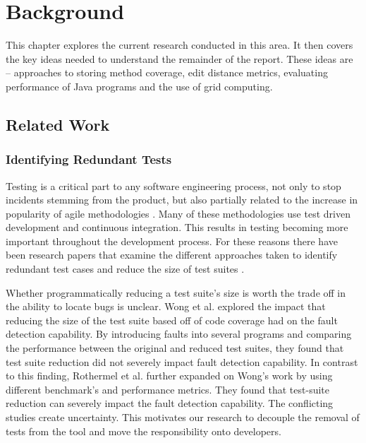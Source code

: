 \chapter{Background}\label{C:related}

This chapter explores the current research conducted in this area. It then covers the key ideas needed to understand the remainder of the report. These ideas are -- approaches to storing method coverage, edit distance metrics, evaluating performance of Java programs and the use of grid computing.

\section{Related Work}
\label{relatedworkRef}
\subsection{Identifying Redundant Tests}
Testing is a critical part to any software engineering process, not only to stop incidents stemming from the product, but also partially related to the increase in popularity of agile methodologies \cite{chaos}. Many of these methodologies use test driven development and continuous integration. This results in testing becoming more important throughout the development process. For these reasons there have been research papers that examine the different approaches taken to identify redundant test cases and reduce the size of test suites \cite{wong1995effect, wong1999test, rothermel1998empirical, rothermel2002empirical,koochakzadeh2009test,zhang2011empirical,li2008static}.

Whether programmatically reducing a test suite's size is worth the trade off in the ability to locate bugs is unclear.  Wong et al. \cite{wong1995effect, wong1999test} explored the impact that reducing the size of the test suite based off of code coverage had on the fault detection capability. By introducing faults into several programs and comparing the performance between the original and reduced test suites, they found that test suite reduction did not severely impact fault detection capability. In contrast to this finding, Rothermel et al. \cite{rothermel1998empirical, rothermel2002empirical} further expanded on Wong's work by using different benchmark's and performance metrics. They found that test-suite reduction can severely impact the fault detection capability. The conflicting studies create uncertainty. This motivates our research to decouple the removal of tests from the tool and move the responsibility onto developers. 

